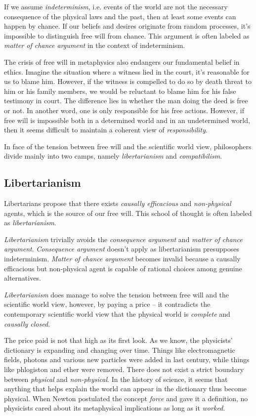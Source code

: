 If we assume \emph{indeterminism}, i.e. events of the world are not the necessary consequence of the physical laws and the past, then at least some events can happen by chance. If our beliefs and desires originate from random processes, it’s impossible to distinguish free will from chance. This argument is often labeled as \emph{matter of chance argument} in the context of indeterminism.

The crisis of free will in metaphysics also endangers our fundamental belief in ethics. Imagine the situation where a witness lied in the court, it's reasonable for us to blame him. However, if the witness is compelled to do so by death threat to him or his family members, we would be reluctant to blame him for his false testimony in court. The difference lies in whether the man doing the deed is free or not. In another word, one is only responsible for his free actions. However, if free will is impossible both in a determined world and in an undetermined world, then it seems difficult to maintain a coherent view of \emph{responsibility}.

In face of the tension between free will and the scientific world view, philosophers divide mainly into two camps, namely \emph{libertarianism} and \emph{compatibilism}.

\subsection{Libertarianism}

Libertarians propose that there exists \emph{causally efficacious} and \emph{non-physical} agents, which is the source of our free will. This school of thought is often labeled as \emph{libertarianism}.

\emph{Libertarianism} trivially avoids the \emph{consequence argument} and \emph{matter of chance argument}. \emph{Consequence argument} doesn't apply as libertarianism presupposes indeterminism. \emph{Matter of chance argument} becomes invalid because a causally efficacious but non-physical agent is capable of rational choices among genuine alternatives.

\emph{Libertarianism} does manage to solve the tension between free will and the scientific world view, however, by paying a price -- it contradicts the contemporary scientific world view that the physical world is \emph{complete} and \emph{causally closed}.

The price paid is not that high as its first look. As we know, the physicists' dictionary is expanding and changing over time. Things like electromagnetic fields, photons and various new particles were added in last century, while things like phlogiston and ether were removed. There does not exist a strict boundary between \emph{physical} and \emph{non-physical}. In the history of science, it seems that anything that helps explain the world can appear in the dictionary thus become physical. When Newton postulated the concept \emph{force} and gave it a definition, no physicists cared about its metaphysical implications as long as it \emph{worked}.

